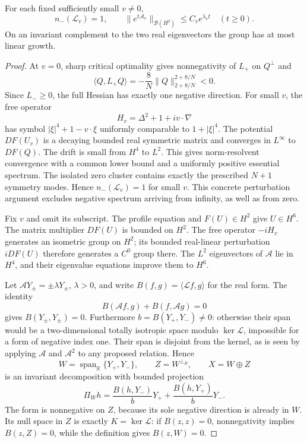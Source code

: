 \begin{lemma}\label{lem:r12-group-bound}
For each fixed sufficiently small $v\ne0$,
\[
 n_-(\mathcal L_v)=1,
 \qquad
 \|e^{t\mathcal A_v}\|_{\mathcal B(H^2)}\le C_v e^{\lambda_vt}
 \quad(t\ge0).
\]
On an invariant complement to the two real eigenvectors the group
has at most linear growth.
\end{lemma}
\begin{proof}
At $v=0$, sharp critical optimality gives nonnegativity of $L_+$ on
$Q^\perp$ and
\[
 \langle Q,L_+Q\rangle=-\frac8N\|Q\|_{2+8/N}^{2+8/N}<0.
\]
Since $L_-\ge0$, the full Hessian has exactly one negative direction.
For small $v$, the free operator
\[
 H_v=\Delta^2+1+iv\cdot\nabla
\]
has symbol $|\xi|^4+1-v\cdot\xi$ uniformly comparable to
$1+|\xi|^4$. The potential $DF(U_v)$ is a decaying bounded real
symmetric matrix and converges in $L^\infty$ to $DF(Q)$. The drift
is small from $H^4$ to $L^2$. This gives norm-resolvent convergence
with a common lower bound and a uniformly positive essential spectrum.
The isolated zero cluster contains exactly the prescribed $N+1$
symmetry modes. Hence $n_-(\mathcal L_v)=1$ for small $v$.
This concrete perturbation argument excludes negative spectrum arriving
from infinity, as well as from zero.

Fix $v$ and omit its subscript. The profile equation and $F(U)\in H^2$
give $U\in H^6$. The matrix multiplier $DF(U)$ is bounded on $H^2$.
The free operator $-iH_v$ generates an isometric group on $H^2$;
its bounded real-linear perturbation $iDF(U)$ therefore generates a
$C^0$ group there. The $L^2$ eigenvectors of $\mathcal A$ lie in
$H^4$, and their eigenvalue equations improve them to $H^6$.

Let $\mathcal A Y_\pm=\pm\lambda Y_\pm$, $\lambda>0$, and write
$B(f,g)=\langle\mathcal Lf,g\rangle$ for the real form. The identity
\[
 B(\mathcal Af,g)+B(f,\mathcal Ag)=0
\]
gives $B(Y_\pm,Y_\pm)=0$. Furthermore
$b=B(Y_+,Y_-)\ne0$: otherwise their span would be a two-dimensional
totally isotropic space modulo $\ker\mathcal L$, impossible for a
form of negative index one. Their span is disjoint from the kernel,
as is seen by applying $\mathcal A$ and $\mathcal A^2$ to any
proposed relation. Hence
\[
 W=\operatorname{span}_{\mathbb R}\{Y_+,Y_-\},\qquad
 Z=W^{\perp_B},\qquad X=W\oplus Z
\]
is an invariant decomposition with bounded projection
\[
 \Pi_Wh=\frac{B(h,Y_-)}bY_++\frac{B(h,Y_+)}bY_-.
\]
The form is nonnegative on $Z$, because its sole negative direction
is already in $W$. Its null space in $Z$ is exactly
$K=\ker\mathcal L$: if $B(z,z)=0$, nonnegativity implies
$B(z,Z)=0$, while the definition gives $B(z,W)=0$.


\end{proof}

